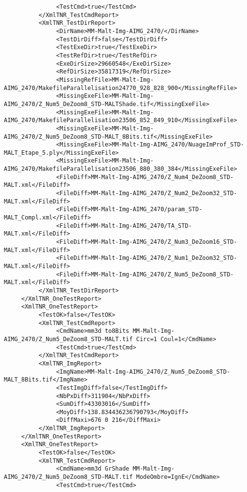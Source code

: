 \documentclass[a4paper]{book}
\begin{document}
\begin{lstlisting}
               <TestCmd>true</TestCmd>
          </XmlTNR_TestCmdReport>
          <XmlTNR_TestDirReport>
               <DirName>MM-Malt-Img-AIMG_2470/</DirName>
               <TestDirDiff>false</TestDirDiff>
               <TestExeDir>true</TestExeDir>
               <TestRefDir>true</TestRefDir>
               <ExeDirSize>29660548</ExeDirSize>
               <RefDirSize>35817319</RefDirSize>
               <MissingRefFile>MM-Malt-Img-AIMG_2470/MakefileParallelisation24770_928_828_900</MissingRefFile>
               <MissingExeFile>MM-Malt-Img-AIMG_2470/Z_Num5_DeZoom8_STD-MALTShade.tif</MissingExeFile>
               <MissingExeFile>MM-Malt-Img-AIMG_2470/MakefileParallelisation23506_852_849_910</MissingExeFile>
               <MissingExeFile>MM-Malt-Img-AIMG_2470/Z_Num5_DeZoom8_STD-MALT_8Bits.tif</MissingExeFile>
               <MissingExeFile>MM-Malt-Img-AIMG_2470/NuageImProf_STD-MALT_Etape_5.ply</MissingExeFile>
               <MissingExeFile>MM-Malt-Img-AIMG_2470/MakefileParallelisation23506_880_380_384</MissingExeFile>
               <FileDiff>MM-Malt-Img-AIMG_2470/Z_Num4_DeZoom8_STD-MALT.xml</FileDiff>
               <FileDiff>MM-Malt-Img-AIMG_2470/Z_Num2_DeZoom32_STD-MALT.xml</FileDiff>
               <FileDiff>MM-Malt-Img-AIMG_2470/param_STD-MALT_Compl.xml</FileDiff>
               <FileDiff>MM-Malt-Img-AIMG_2470/TA_STD-MALT.xml</FileDiff>
               <FileDiff>MM-Malt-Img-AIMG_2470/Z_Num3_DeZoom16_STD-MALT.xml</FileDiff>
               <FileDiff>MM-Malt-Img-AIMG_2470/Z_Num1_DeZoom32_STD-MALT.xml</FileDiff>
               <FileDiff>MM-Malt-Img-AIMG_2470/Z_Num5_DeZoom8_STD-MALT.xml</FileDiff>
          </XmlTNR_TestDirReport>
     </XmlTNR_OneTestReport>
     <XmlTNR_OneTestReport>
          <TestOK>false</TestOK>
          <XmlTNR_TestCmdReport>
               <CmdName>mm3d to8Bits MM-Malt-Img-AIMG_2470/Z_Num5_DeZoom8_STD-MALT.tif Circ=1 Coul=1</CmdName>
               <TestCmd>true</TestCmd>
          </XmlTNR_TestCmdReport>
          <XmlTNR_ImgReport>
               <ImgName>MM-Malt-Img-AIMG_2470/Z_Num5_DeZoom8_STD-MALT_8Bits.tif</ImgName>
               <TestImgDiff>false</TestImgDiff>
               <NbPxDiff>311904</NbPxDiff>
               <SumDiff>43303016</SumDiff>
               <MoyDiff>138.834436236790793</MoyDiff>
               <DiffMaxi>676 0 216</DiffMaxi>
          </XmlTNR_ImgReport>
     </XmlTNR_OneTestReport>
     <XmlTNR_OneTestReport>
          <TestOK>false</TestOK>
          <XmlTNR_TestCmdReport>
               <CmdName>mm3d GrShade MM-Malt-Img-AIMG_2470/Z_Num5_DeZoom8_STD-MALT.tif ModeOmbre=IgnE</CmdName>
               <TestCmd>true</TestCmd>

\end{lstlisting}
\end{document}
